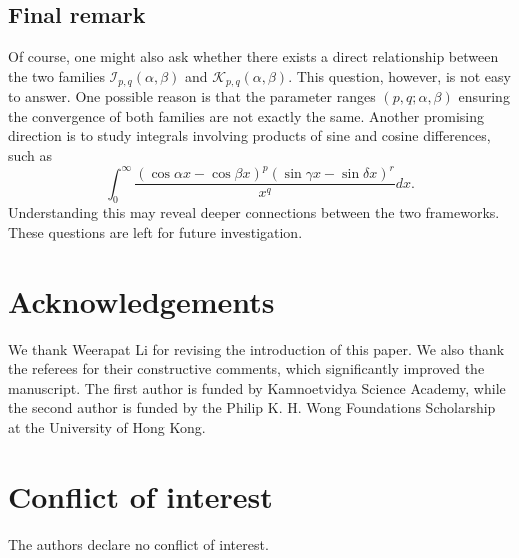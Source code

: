 \documentclass[12pt, reqno]{amsart}
\theoremstyle{plain}
\theoremstyle{definition}
\begin{document}
\subsection{Final remark}


Of course, one might also ask whether there exists a direct relationship between the two families $\mathcal{I}_{p, q}(\alpha, \beta)$ and $\mathcal{K}_{p, q}(\alpha, \beta)$. This question, however, is not easy to answer. One possible reason is that the parameter ranges $(p, q; \alpha, \beta)$ ensuring the convergence of both families are not exactly the same. Another promising direction is to study integrals involving products of sine and cosine differences, such as
\[\int_0^{\infty}\frac{(\cos\alpha x-\cos \beta x)^p(\sin\gamma x-\sin\delta x)^r}{x^q}dx.\]
Understanding this may reveal deeper connections between the two frameworks. 
These questions are left for future investigation.

\section*{Acknowledgements}

We thank Weerapat Li for revising the introduction of this paper. We also thank the referees for their constructive comments, which significantly improved the manuscript. The  first author is funded by Kamnoetvidya Science Academy, while the second author is funded by the Philip K. H. Wong Foundations Scholarship at the University of Hong Kong.
 



\section*{Conflict of interest}

The authors declare no conflict of interest.
\end{document}
